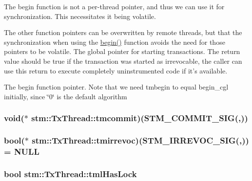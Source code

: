 The begin function is not a per-\/thread pointer, and thus we can use it for synchronization. This necessitates it being volatile.

The other function pointers can be overwritten by remote threads, but that the synchronization when using the \hyperlink{namespacestm_a5dc0e1df0fe411722145e01e8b09b4b8}{begin()} function avoids the need for those pointers to be volatile. The global pointer for starting transactions. The return value should be true if the transaction was started as irrevocable, the caller can use this return to execute completely uninstrumented code if it's available.

The begin function pointer. Note that we need tmbegin to equal begin\-\_\-cgl initially, since \char`\"{}0\char`\"{} is the default algorithm \hypertarget{structstm_1_1TxThread_a98f7df70804772d4205354933bd76b25}{
\subsubsection[{tmcommit}]{ void($\ast$ stm\-::\-Tx\-Thread\-::tmcommit)({\bf S\-T\-M\-\_\-\-C\-O\-M\-M\-I\-T\-\_\-\-S\-I\-G}(,))}}\label{structstm_1_1TxThread_a98f7df70804772d4205354933bd76b25}
\hypertarget{structstm_1_1TxThread_a1052fca6b76285b98233a67f9a865775}{
\subsubsection[{tmirrevoc}]{\setlength{\rightskip}{0pt plus 5cm}bool($\ast$ stm\-::\-Tx\-Thread\-::tmirrevoc)({\bf S\-T\-M\-\_\-\-I\-R\-R\-E\-V\-O\-C\-\_\-\-S\-I\-G}(,)) = N\-U\-L\-L\hspace{0.3cm}{\ttfamily [static]}}}\label{structstm_1_1TxThread_a1052fca6b76285b98233a67f9a865775}
\hypertarget{structstm_1_1TxThread_aa9915dd0831b64f59ef287810312787b}{
\subsubsection[{tml\-Has\-Lock}]{\setlength{\rightskip}{0pt plus 5cm}bool stm\-::\-Tx\-Thread\-::tml\-Has\-Lock}}\label{structstm_1_1TxThread_aa9915dd0831b64f59ef287810312787b}

